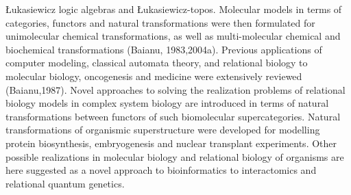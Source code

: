 \documentclass[12pt]{article}
\theoremstyle{plain}
\theoremstyle{definition}
\numberwithin{equation}{section}
\newcommand{\<}{{\langle}}
\begin{document}
\L ukasiewicz logic algebras and \L ukasiewicz-topos. Molecular models in terms of categories, functors and natural transformations were then formulated for unimolecular chemical transformations, as well as multi-molecular chemical and biochemical transformations (Baianu, 1983,2004a). Previous applications of computer modeling, classical automata theory, and relational biology to molecular biology, oncogenesis and medicine were extensively reviewed (Baianu,1987). Novel approaches to solving the realization problems of relational biology models in complex system biology are introduced in terms of natural transformations between functors of such biomolecular supercategories. Natural transformations of organismic superstructure were  developed for modelling protein biosynthesis, embryogenesis and nuclear transplant experiments. Other possible realizations in molecular biology and relational biology of organisms are here suggested as a novel approach to bioinformatics to interactomics and relational quantum genetics. 
\end{document}
